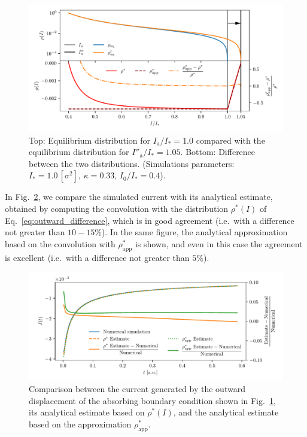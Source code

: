 \begin{figure}[htp]
    \centering
    \includegraphics[width=\textwidth]{4_probing_the_diffusive_behavior/figs/final/difference_outwards_s.pdf}
    \caption{Top: Equilibrium distribution for $I_\mathrm{a}/I_\ast = 1.0$ compared with the equilibrium distribution for $I''_\mathrm{a}/I_\ast = 1.05$. Bottom: Difference between the two distributions. (Simulations parameters: $I_\ast = 1.0\,[\sigma^2],\, \kappa = 0.33,\, I_0/I_\ast = 0.4$).}
    \label{fig:6}
\end{figure}

In Fig.~\ref{fig:7}, we compare the simulated current with its analytical estimate, obtained by computing the convolution with the distribution $\rho^\ast(I)$ of Eq.~\eqref{eq:outward_difference}, which is in good agreement {(i.e.\ with a difference not greater than $10-15\%$)}. In the same figure, the analytical approximation based on the convolution with $\rho^\ast_\text{app}$ is shown, and even in this case the agreement is excellent {(i.e.\ with a difference not greater than $5\%$)}.

\begin{figure}[htp]
    \centering
    \includegraphics[width=\textwidth]{4_probing_the_diffusive_behavior/figs/final/current_outwards.pdf}
    \caption{Comparison between the current generated by the outward displacement of the absorbing boundary condition shown in Fig.~\ref{fig:6}, its analytical estimate based on $\rho^\ast(I)$, and the analytical estimate based on the approximation $\rho^\ast_\text{app}$.}
    \label{fig:7}
\end{figure}

